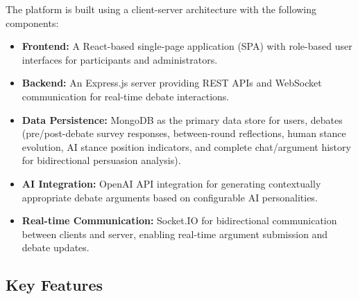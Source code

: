 The platform is built using a client-server architecture with the following components:

\begin{itemize}
    \item \textbf{Frontend:} A React-based single-page application (SPA) with role-based user
    interfaces for participants and administrators.

    \item \textbf{Backend:} An Express.js server providing REST APIs and WebSocket communication
    for real-time debate interactions.

    \item \textbf{Data Persistence:} MongoDB as the primary data store for users, debates
    (pre/post-debate survey responses, between-round reflections, human stance evolution, AI stance position
    indicators, and complete chat/argument history for bidirectional persuasion analysis).

    \item \textbf{AI Integration:} OpenAI API integration for generating contextually appropriate
    debate arguments based on configurable AI personalities.

    \item \textbf{Real-time Communication:} Socket.IO for bidirectional communication between
    clients and server, enabling real-time argument submission and debate updates.
\end{itemize}

\subsection{Key Features}

